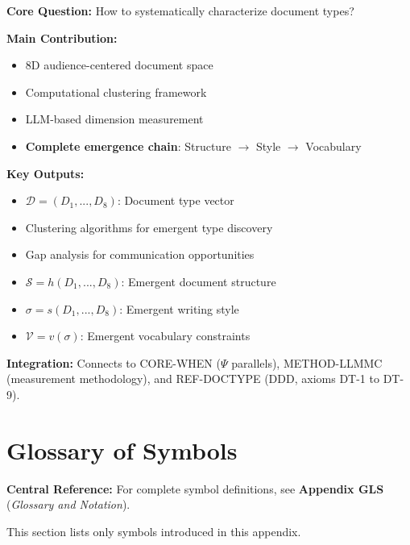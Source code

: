 \begin{tcolorbox}[colback=green!10!white, colframe=green!75!black,
    title=\textbf{Appendix DTC: Summary}]

\textbf{Core Question:} How to systematically characterize document types?

\textbf{Main Contribution:}
\begin{itemize}[nosep]
    \item 8D audience-centered document space
    \item Computational clustering framework
    \item LLM-based dimension measurement
    \item \textbf{Complete emergence chain}: Structure $\to$ Style $\to$ Vocabulary
\end{itemize}

\textbf{Key Outputs:}
\begin{itemize}[nosep]
    \item $\mathcal{D} = (D_1, ..., D_8)$: Document type vector
    \item Clustering algorithms for emergent type discovery
    \item Gap analysis for communication opportunities
    \item $\mathcal{S} = h(D_1, ..., D_8)$: Emergent document structure
    \item $\sigma = s(D_1, ..., D_8)$: Emergent writing style
    \item $\mathcal{V} = v(\sigma)$: Emergent vocabulary constraints
\end{itemize}

\textbf{Integration:} Connects to CORE-WHEN ($\Psi$ parallels),
METHOD-LLMMC (measurement methodology), and REF-DOCTYPE (DDD, axioms DT-1 to DT-9).

\end{tcolorbox}


\section{Glossary of Symbols}
\label{sec:doctype-glossary}

\begin{tcolorbox}[colback=blue!5!white, colframe=blue!75!black]
\textbf{Central Reference:} For complete symbol definitions, see
\textbf{Appendix GLS} (\textit{Glossary and Notation}).

This section lists only symbols introduced in this appendix.
\end{tcolorbox}

